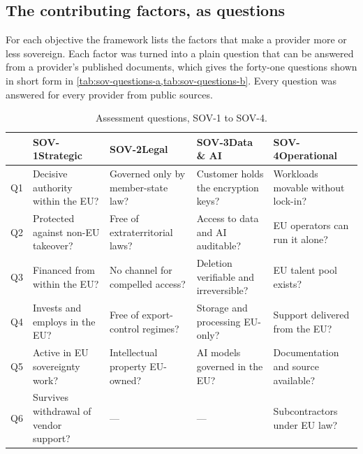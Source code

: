 \subsection*{The contributing factors, as questions}

For each objective the framework lists the factors that make a provider more or less
sovereign. Each factor was turned into a plain question that can be answered from a
provider's published documents, which gives the forty-one questions shown in short
form in \cref{tab:sov-questions-a,tab:sov-questions-b}. Every question was answered
for every provider from public sources.

\begin{table}[htbp]
  \centering
  \caption{Assessment questions, SOV-1 to SOV-4.}
  \label{tab:sov-questions-a}
  \footnotesize
  \renewcommand{\arraystretch}{1.2}
  \begin{tabularx}{\textwidth}{@{}c X X X X@{}}
    \toprule
    & \textbf{SOV-1}\newline Strategic
    & \textbf{SOV-2}\newline Legal
    & \textbf{SOV-3}\newline Data \& AI
    & \textbf{SOV-4}\newline Operational \\
    \midrule
    Q1 & Decisive authority within the \acs{EU}?
       & Governed only by member-state law?
       & Customer holds the encryption keys?
       & Workloads movable without lock-in? \\
    Q2 & Protected against non-\acs{EU} takeover?
       & Free of extraterritorial laws?
       & Access to data and \acs{AI} auditable?
       & \acs{EU} operators can run it alone? \\
    Q3 & Financed from within the \acs{EU}?
       & No channel for compelled access?
       & Deletion verifiable and irreversible?
       & \acs{EU} talent pool exists? \\
    Q4 & Invests and employs in the \acs{EU}?
       & Free of export-control regimes?
       & Storage and processing \acs{EU}-only?
       & Support delivered from the \acs{EU}? \\
    Q5 & Active in \acs{EU} sovereignty work?
       & Intellectual property \acs{EU}-owned?
       & \acs{AI} models governed in the \acs{EU}?
       & Documentation and source available? \\
    Q6 & Survives withdrawal of vendor support?
       & ---
       & ---
       & Subcontractors under \acs{EU} law? \\
    \bottomrule
  \end{tabularx}
\end{table}

